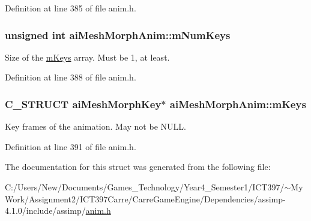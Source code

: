 Definition at line 385 of file anim.h.\hypertarget{structai_mesh_morph_anim_f9c8a3e37613a196ed33d2746cf6f0c8}{
\subsubsection[mNumKeys]{\setlength{\rightskip}{0pt plus 5cm}unsigned int {\bf aiMeshMorphAnim::mNumKeys}}}
\label{structai_mesh_morph_anim_f9c8a3e37613a196ed33d2746cf6f0c8}


Size of the \hyperlink{structai_mesh_morph_anim_0d4f98ee7eb4e2aaabf31eba48bd14c2}{mKeys} array. Must be 1, at least. 

Definition at line 388 of file anim.h.\hypertarget{structai_mesh_morph_anim_0d4f98ee7eb4e2aaabf31eba48bd14c2}{
\subsubsection[mKeys]{\setlength{\rightskip}{0pt plus 5cm}C\_\-STRUCT {\bf aiMeshMorphKey}$\ast$ {\bf aiMeshMorphAnim::mKeys}}}
\label{structai_mesh_morph_anim_0d4f98ee7eb4e2aaabf31eba48bd14c2}


Key frames of the animation. May not be NULL. 

Definition at line 391 of file anim.h.

The documentation for this struct was generated from the following file:\begin{CompactItemize}
\item 
C:/Users/New/Documents/Games\_\-Technology/Year4\_\-Semester1/ICT397/$\sim$My Work/Assignment2/ICT397Carre/CarreGameEngine/Dependencies/assimp-4.1.0/include/assimp/\hyperlink{anim_8h}{anim.h}\end{CompactItemize}
